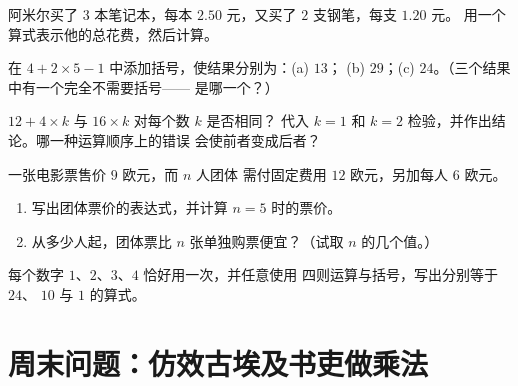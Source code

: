 \begin{exercise}[$\star$]\label{exo:g7:priorities:7}
阿米尔买了 $3$ 本笔记本，每本 $2.50$ 元，又买了 $2$ 支钢笔，每支 $1.20$ 元。
用一个算式表示他的总花费，然后计算。
\end{exercise}

\begin{exercise}[$\star\star$]\label{exo:g7:priorities:8}
在 $4 + 2 \times 5 - 1$ 中添加括号，使结果分别为：(a) $13$；
(b) $29$；(c) $24$。（三个结果中有一个完全不需要括号——
是哪一个？）
\end{exercise}

\begin{exercise}[$\star\star$]\label{exo:g7:priorities:9}
$12 + 4 \times k$ 与 $16 \times k$ 对每个数 $k$ 是否相同？
代入 $k = 1$ 和 $k = 2$ 检验，并作出结论。哪一种运算顺序上的错误
会使前者变成后者？
\end{exercise}

\begin{exercise}[$\star\star$]\label{exo:g7:priorities:10}
一张电影票售价 $9$ 欧元，而 $n$ 人团体
需付固定费用 $12$ 欧元，另加每人 $6$ 欧元。
\begin{enumerate}
  \item 写出团体票价的表达式，并计算
        $n = 5$ 时的票价。
  \item 从多少人起，团体票比 $n$
        张单独购票便宜？（试取 $n$ 的几个值。）
\end{enumerate}
\end{exercise}

\begin{exercise}[$\star\star\star$]\label{exo:g7:priorities:11}
每个数字 $1$、$2$、$3$、$4$ 恰好用一次，并任意使用
四则运算与括号，写出分别等于 $24$、
$10$ 与 $1$ 的算式。
\end{exercise}

\section{周末问题：仿效古埃及书吏做乘法}

